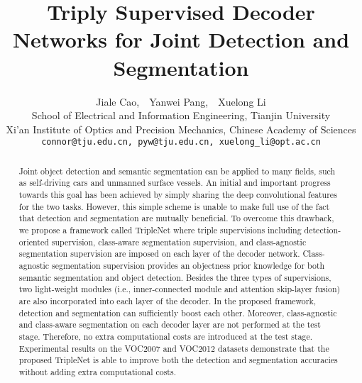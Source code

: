 \documentclass[10pt,twocolumn,letterpaper]{article}
\begin{document}
\title{Triply Supervised Decoder Networks for Joint Detection and Segmentation}


\author{Jiale Cao,~~Yanwei Pang,~~Xuelong Li\\
 School of Electrical and Information Engineering, Tianjin University\\
Xi'an Institute of Optics and Precision Mechanics, Chinese Academy of Sciences\\
{\tt\small connor@tju.edu.cn, pyw@tju.edu.cn, xuelong\_li@opt.ac.cn}
}
\maketitle


\begin{abstract}
Joint object detection and semantic segmentation can be applied to many fields, such as self-driving cars and unmanned surface vessels. An initial and important progress towards this goal has been achieved by simply sharing the deep convolutional features for the two tasks. However, this simple scheme is unable to make full use of the fact that detection and segmentation are mutually beneficial. To overcome this drawback, we propose a framework called TripleNet where triple supervisions including detection-oriented supervision, class-aware segmentation supervision, and class-agnostic segmentation supervision are imposed on each layer of the decoder network. Class-agnostic segmentation supervision provides an objectness prior knowledge for both semantic segmentation and object detection.  Besides the three types of supervisions, two light-weight modules (i.e., inner-connected module and attention skip-layer fusion) are also incorporated into each layer of the decoder. In the proposed framework, detection and segmentation can sufficiently boost each other. Moreover, class-agnostic and class-aware segmentation on each decoder layer are not performed at the test stage. Therefore, no extra computational costs are introduced at the test stage. Experimental results on the VOC2007 and VOC2012 datasets demonstrate that the proposed TripleNet is able to improve both the detection and segmentation accuracies without adding extra computational costs. 
\end{abstract}
\end{document}
